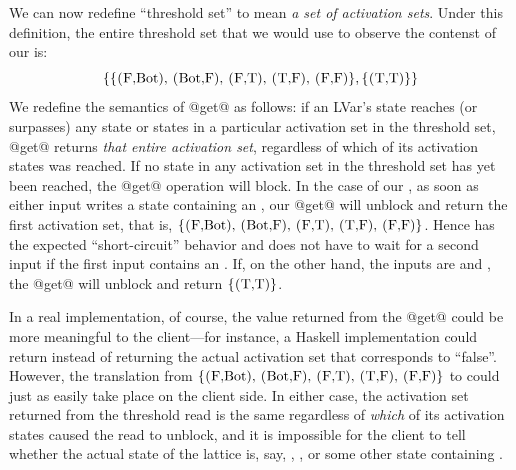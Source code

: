 We can now redefine ``threshold set'' to mean \emph{a set of
  activation sets}.  Under this definition, the entire threshold set
that we would use to observe the contenst of our  is:
\[
\{ 
\{ \textrm{\il{(F,Bot)}, \il{(Bot,F)}, \il{(F,T)}, \il{(T,F)}, \il{(F,F)}} \},
\{ \textrm{\il{(T,T)}} \}
\}
\]
We redefine the semantics of @get@ as follows: if an LVar's state
reaches (or surpasses) any state or states in a particular activation
set in the threshold set, @get@ returns \emph{that entire activation
  set}, regardless of which of its activation states was reached. If
no state in any activation set in the threshold set has yet been
reached, the @get@ operation will block.  In the case of our
, as soon as either input writes a state containing an
, our @get@ will unblock and return the first activation set,
that is, $\{ \textrm{\il{(F,Bot)}, \il{(Bot,F)}, \il{(F,T)},
  \il{(T,F)}, \il{(F,F)}} \}$.  Hence  has the expected
``short-circuit'' behavior and does not have to wait for a second
input if the first input contains an .  If, on the other hand,
the inputs are  and , the @get@ will unblock
and return $\{ \textrm{\il{(T,T)}} \}$.

In a real implementation, of course, the value returned from the @get@
could be more meaningful to the client---for instance, a Haskell
implementation could return  instead of returning the actual
activation set that corresponds to ``false''.  However, the
translation from $\{ \textrm{\il{(F,Bot)}, \il{(Bot,F)}, \il{(F,T)},
  \il{(T,F)}, \il{(F,F)}} \}$ to  could just as easily take
place on the client side.  In either case, the activation set returned
from the threshold read is the same regardless of \emph{which} of its
activation states caused the read to unblock, and it is impossible for
the client to tell whether the actual state of the lattice is, say,
, , or some other state containing .


